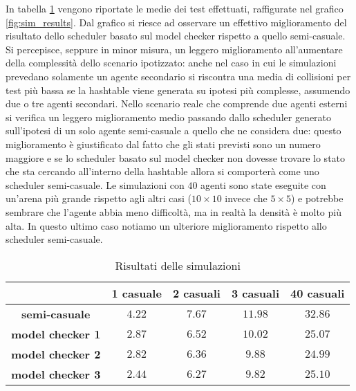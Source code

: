 In tabella \ref{tab:sim_results} vengono riportate le medie dei test effettuati, raffigurate nel grafico \ref{fig:sim_results}. Dal grafico si riesce ad osservare un effettivo miglioramento del risultato dello scheduler basato sul model checker rispetto a quello semi-casuale. Si percepisce, seppure in minor misura, un leggero miglioramento all'aumentare della complessità dello scenario ipotizzato: anche nel caso in cui le simulazioni prevedano solamente un agente secondario si riscontra una media di collisioni per test più bassa se la hashtable viene generata su ipotesi più complesse, assumendo due o tre agenti secondari. Nello scenario reale che comprende due agenti esterni si verifica un leggero miglioramento medio passando dallo scheduler generato sull'ipotesi di un solo agente semi-casuale a quello che ne considera due: questo miglioramento è giustificato dal fatto che gli stati previsti sono un numero maggiore e se lo scheduler basato sul model checker non dovesse trovare lo stato che sta cercando all'interno della hashtable allora si comporterà come uno scheduler semi-casuale. Le simulazioni con $40$ agenti sono state eseguite con un'arena più grande rispetto agli altri casi ($10 \times 10$ invece che $5 \times 5$) e potrebbe sembrare che l'agente abbia meno difficoltà, ma in realtà la densità è molto più alta. In questo ultimo caso notiamo un ulteriore miglioramento rispetto allo scheduler semi-casuale.

\begin{table}[htbp!]
	\begin{center}
	\begin{tabular}{|c||c|c|c|c|}
	\hline
	& \textbf{1 casuale} & \textbf{2 casuali} & \textbf{3 casuali} & \textbf{40 casuali} \\
	\hline
	\hline
	\textbf{semi-casuale} & $4.22$ & $7.67$ & $11.98$ & $32.86$ \\
	\hline
	\textbf{model checker 1} & $2.87$ & $6.52$ & $10.02$ & $25.07$ \\
	\hline
	\textbf{model checker 2} & $2.82$ & $6.36$ & $9.88$ & $24.99$ \\
	\hline
	\textbf{model checker 3} & $2.44$ & $6.27$ & $9.82$ & $25.10$ \\
	\hline
	\end{tabular}
	\end{center}
	\caption{Risultati delle simulazioni}
	\label{tab:sim_results}
\end{table}

